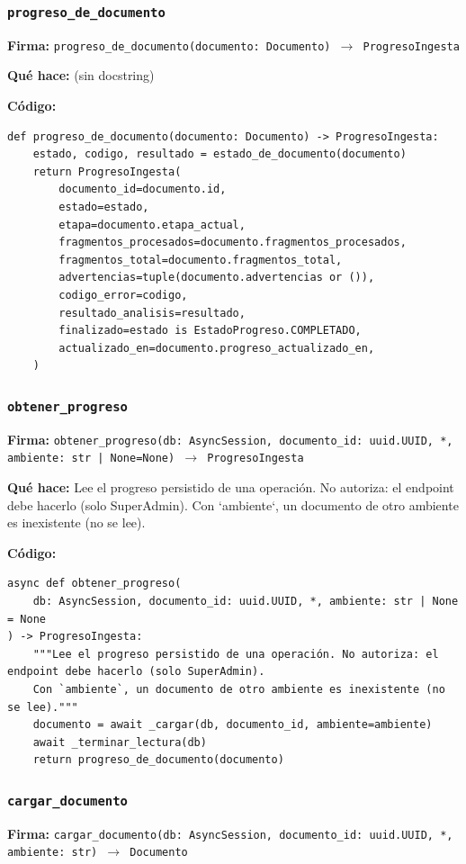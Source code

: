 \documentclass[11pt,a4paper]{article}
\begin{document}
\subsubsection*{\texttt{progreso\_de\_documento}}
\textbf{Firma:} \texttt{progreso\_de\_documento(documento: Documento) $\rightarrow$ ProgresoIngesta}

\textbf{Qué hace:} (sin docstring)

\textbf{Código:}
\begin{lstlisting}
def progreso_de_documento(documento: Documento) -> ProgresoIngesta:
    estado, codigo, resultado = estado_de_documento(documento)
    return ProgresoIngesta(
        documento_id=documento.id,
        estado=estado,
        etapa=documento.etapa_actual,
        fragmentos_procesados=documento.fragmentos_procesados,
        fragmentos_total=documento.fragmentos_total,
        advertencias=tuple(documento.advertencias or ()),
        codigo_error=codigo,
        resultado_analisis=resultado,
        finalizado=estado is EstadoProgreso.COMPLETADO,
        actualizado_en=documento.progreso_actualizado_en,
    )
\end{lstlisting}

\subsubsection*{\texttt{obtener\_progreso}}
\textbf{Firma:} \texttt{obtener\_progreso(db: AsyncSession, documento\_id: uuid.UUID, *, ambiente: str | None=None) $\rightarrow$ ProgresoIngesta}

\textbf{Qué hace:} Lee el progreso persistido de una operación. No autoriza: el endpoint debe hacerlo (solo SuperAdmin).
Con `ambiente`, un documento de otro ambiente es inexistente (no se lee).

\textbf{Código:}
\begin{lstlisting}
async def obtener_progreso(
    db: AsyncSession, documento_id: uuid.UUID, *, ambiente: str | None = None
) -> ProgresoIngesta:
    """Lee el progreso persistido de una operación. No autoriza: el endpoint debe hacerlo (solo SuperAdmin).
    Con `ambiente`, un documento de otro ambiente es inexistente (no se lee)."""
    documento = await _cargar(db, documento_id, ambiente=ambiente)
    await _terminar_lectura(db)
    return progreso_de_documento(documento)
\end{lstlisting}

\subsubsection*{\texttt{cargar\_documento}}
\textbf{Firma:} \texttt{cargar\_documento(db: AsyncSession, documento\_id: uuid.UUID, *, ambiente: str) $\rightarrow$ Documento}
\end{document}

